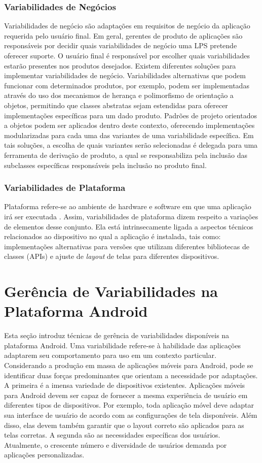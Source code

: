 \subsubsection{Variabilidades de Negócios}
Variabilidades de negócio são adaptações em requisitos de negócio da aplicação
requerida pelo usuário final. Em geral, gerentes de produto de aplicações são
responsáveis por decidir quais variabilidades de negócio uma LPS pretende oferecer
suporte. O usuário final é responsável por escolher quais variabilidades estarão
presentes nos produtos desejados. Existem diferentes soluções para implementar
variabilidades de negócio. Variabilidades alternativas que podem funcionar com
determinados produtos, por exemplo, podem ser implementadas através do uso dos
mecanismos de herança e polimorfismo de orientação a objetos, permitindo que
classes abstratas sejam estendidas para oferecer implementações específicas para
um dado produto. Padrões de projeto orientados a objetos \cite{Gamma1994} podem ser
aplicados dentro deste contexto, oferecendo implementações modularizadas para
cada uma das variantes de uma variabilidade específica. Em tais soluções, a escolha
de quais variantes serão selecionadas é delegada para uma ferramenta de derivação
de produto, a qual se responsabiliza pela inclusão das subclasses específicas
responsáveis pela inclusão no produto final.

\subsubsection{Variabilidades de Plataforma}
Plataforma refere-se ao ambiente de hardware e software em que uma aplicação irá
ser executada \cite{Preuveneers2004}. Assim, variabilidades de plataforma dizem
respeito a variações
de elementos desse conjunto. Ela está intrinsecamente ligada a aspectos técnicos
relacionados ao dispositivo no qual a aplicação é instalada, tais como:
implementações alternativas para versões que utilizam diferentes bibliotecas de classes
(APIs) e ajuste de \textit{layout} de telas para diferentes dispositivos.

\section{Gerência de Variabilidades na Plataforma Android}

Esta seção introduz técnicas de gerência de variabilidades disponíveis na plataforma
Android. Uma variabilidade refere-se à habilidade das aplicações adaptarem seu comportamento
para uso em um contexto particular. Considerando a produção em massa de aplicações móveis
para Android, pode se identificar duas forças predominantes que orientam a necessidade
por adaptações. A primeira é a imensa variedade de dispositivos existentes. Aplicações
móveis para Android devem ser capaz de fornecer a mesma experiência de usuário em
diferentes tipos de dispositivos. Por exemplo, toda aplicação móvel deve adaptar
sua interface de usuário de acordo com as configurações de tela disponíveis. Além
disso, elas devem também garantir que o layout correto são aplicados para as telas
corretas. A segunda são as necessidades específicas dos usuários. Atualmente, o
crescente número e diversidade de usuários demanda por aplicações personalizadas.

